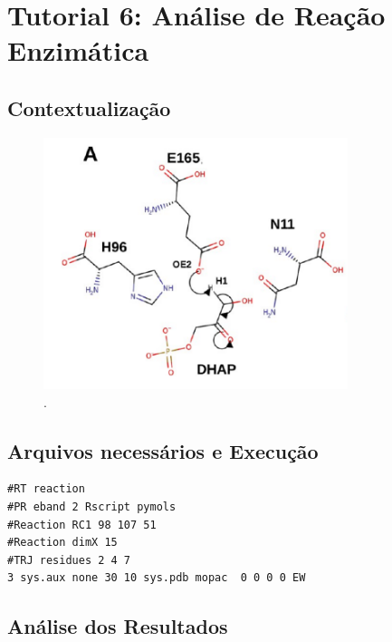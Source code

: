 \documentclass[a4paper,11pt]{refart}
\begin{document}
\newpage
\section{Tutorial 6: Análise de Reação Enzimática}

\subsection{Contextualização}

\hspace*{-\leftmarginwidth}
\begin{minipage}{\fullwidth}
	\begin{figure}[H]
		\begin{center}
			\includegraphics[width=3.5in]{images/tut6_img0}
			\caption{.}
			\label{fig_tut6_0}
		\end{center}
	\end{figure}
\end{minipage}

\subsection{Arquivos necessários e Execução}


\hspace*{-\leftmarginwidth}
\begin{minipage}{\fullwidth}
\begin{lstlisting}[caption={Input editado para execução do tutorial 3},label={tut402}]
#RT reaction 
#PR eband 2 Rscript pymols
#Reaction RC1 98 107 51
#Reaction dimX 15
#TRJ residues 2 4 7
3 sys.aux none 30 10 sys.pdb mopac  0 0 0 0 EW
\end{lstlisting}
\end{minipage}


\subsection{Análise dos Resultados}
\end{document}
